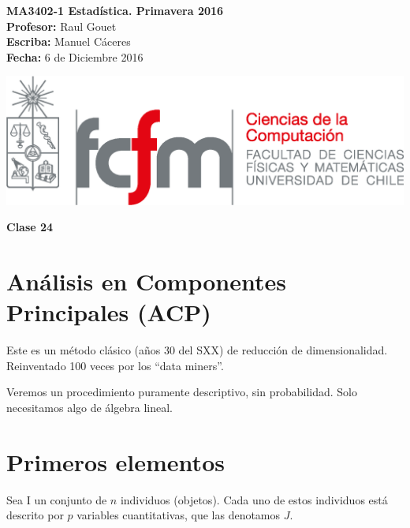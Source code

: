 \documentclass[10pt]{article}
\theoremstyle{plain}
\theoremstyle{definition}
\newcommand{\catnum}{24} %
\newcommand{\fecha}{6 de Diciembre 2016 }
\begin{document}
\vspace*{-1.2 cm}
\begin{minipage}{0.6\textwidth}
\begin{flushleft}
\hspace*{-0.5cm}\textbf{MA3402-1 Estadística. Primavera 2016}\\
\hspace*{-0.5cm}\textbf{Profesor:} Raul Gouet\\
\hspace*{-0.5cm}\textbf{Escriba:} Manuel Cáceres\\
\hspace*{-0.5cm}\textbf{Fecha:} \fecha
\end{flushleft}
\end{minipage}
\begin{minipage}{0.36\textwidth}
\begin{flushright}
\includegraphics[scale=0.3]{imagenes/fcfm_dcc}
\end{flushright}
\end{minipage}
\bigskip

\begin{center}
\LARGE\textbf{Clase \catnum}
\end{center}
\section{Análisis en Componentes Principales (ACP)}
Este es un método clásico (años 30 del SXX) de reducción de dimensionalidad. Reinventado 100 veces por los ``data miners''.

Veremos un procedimiento puramente descriptivo, sin probabilidad.
Solo necesitamos algo de álgebra lineal.

\section{Primeros elementos}
Sea I un conjunto de $n$ individuos (objetos). Cada uno de estos individuos está descrito por $p$ variables cuantitativas, que las denotamos $J$.\\
\end{document}
